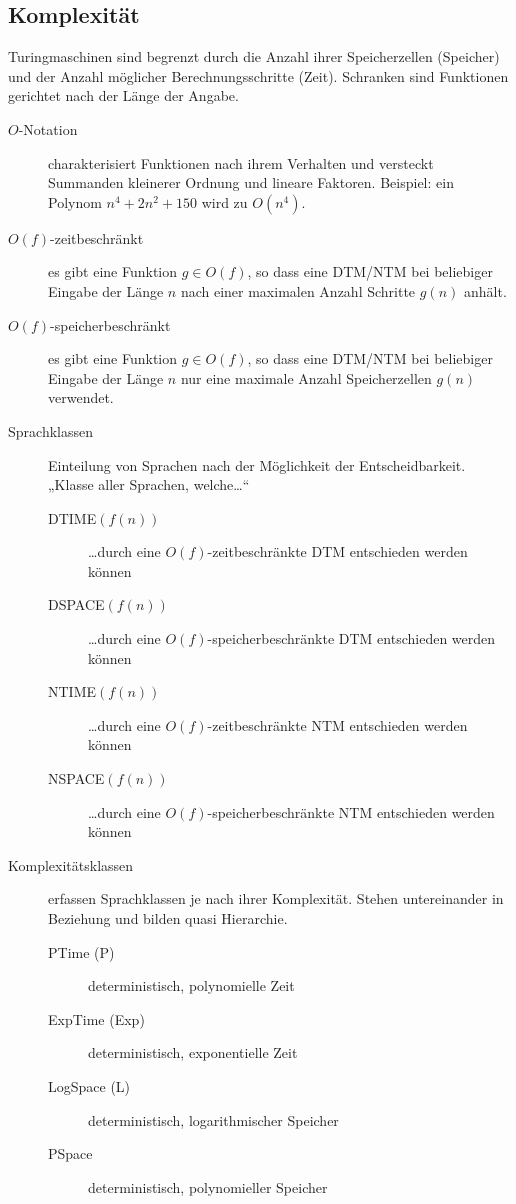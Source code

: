 \subsection{Komplexität}
\label{subsec:fs-komplexitaet}
Turingmaschinen sind begrenzt durch die Anzahl ihrer Speicherzellen (Speicher) und der Anzahl möglicher Berechnungsschritte (Zeit).
Schranken sind Funktionen gerichtet nach der Länge der Angabe. 

\begin{description}
    \item[$O$-Notation] charakterisiert Funktionen nach ihrem Verhalten und versteckt Summanden kleinerer Ordnung und lineare Faktoren. Beispiel: ein Polynom $n^{4} + 2n^{2} + 150$ wird zu $O(n^{4})$.
    \item[$O(f)$-zeitbeschränkt] es gibt eine Funktion $g \in O(f)$, so dass eine DTM/NTM bei beliebiger Eingabe der Länge $n$ nach einer maximalen Anzahl Schritte $g(n)$ anhält.
    \item[$O(f)$-speicherbeschränkt] es gibt eine Funktion $g \in O(f)$, so dass eine DTM/NTM bei beliebiger Eingabe der Länge $n$ nur eine maximale Anzahl Speicherzellen $g(n)$ verwendet.

    \item[Sprachklassen] Einteilung von Sprachen nach der Möglichkeit der Entscheidbarkeit. \\
        „Klasse aller Sprachen, welche…“
        \begin{description}
            \item[DTIME$(f(n))$] …durch eine $O(f)$-zeitbeschränkte DTM entschieden werden können
            \item[DSPACE$(f(n))$] …durch eine $O(f)$-speicherbeschränkte DTM entschieden werden können

            \item[NTIME$(f(n))$] …durch eine $O(f)$-zeitbeschränkte NTM entschieden werden können
            \item[NSPACE$(f(n))$] …durch eine $O(f)$-speicherbeschränkte NTM entschieden werden können
        \end{description}

    \item[Komplexitätsklassen] erfassen Sprachklassen je nach ihrer Komplexität.
        Stehen untereinander in Beziehung und bilden quasi Hierarchie. 
        \begin{description}
            \item[PTime (P)] deterministisch, polynomielle Zeit
            \item[ExpTime (Exp)] deterministisch, exponentielle Zeit
            \item[LogSpace (L)] deterministisch, logarithmischer Speicher
            \item[PSpace] deterministisch, polynomieller Speicher


\end{description}
\end{description}
